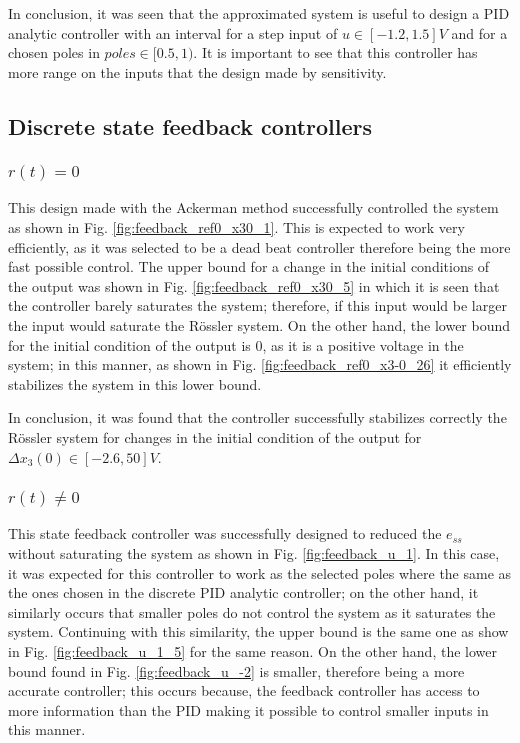 In conclusion, it was seen that the approximated system is useful to design a PID analytic controller with an interval for a step input of $u \in [-1.2, 1.5]V$ and for a chosen poles in $poles \in [0.5, 1)$. It is important to see that this controller has more range on the inputs that the design made by sensitivity.

\subsection{Discrete state feedback controllers}
\subsubsection{$r(t) = 0$}
This design made with the Ackerman method successfully controlled the system as shown in Fig. \ref{fig:feedback_ref0_x30_1}. This is expected to work very efficiently, as it was selected to be a dead beat controller therefore being the more fast possible control. The upper bound for a change in the initial conditions of the output was shown in Fig. \ref{fig:feedback_ref0_x30_5} in which it is seen that the controller barely saturates the system; therefore, if this input would be larger the input would saturate the Rössler system. On the other hand, the lower bound for the initial condition of the output is $0$, as it is a positive voltage in the system; in this manner, as shown in Fig. \ref{fig:feedback_ref0_x3-0_26} it efficiently stabilizes the system in this lower bound. 

In conclusion, it was found that the controller successfully stabilizes correctly the Rössler system for changes in the initial condition of the output for $\Delta x_{3}(0) \in [-2.6, 50]V$.

\subsubsection{$r(t) \neq 0$}
This state feedback controller was successfully designed to reduced the $e_{ss}$ without saturating the system as shown in Fig. \ref{fig:feedback_u_1}. In this case, it was expected for this controller to work as the selected poles where the same as the ones chosen in the discrete PID analytic controller; on the other hand, it similarly occurs that smaller poles do not control the system as it saturates the system. Continuing with this similarity, the upper bound is the same one as show in Fig. \ref{fig:feedback_u_1_5} for the same reason. On the other hand, the lower bound found in Fig. \ref{fig:feedback_u_-2} is smaller, therefore being a more accurate controller; this occurs because, the feedback controller has access to more information than the PID making it possible to control smaller inputs in this manner. 

